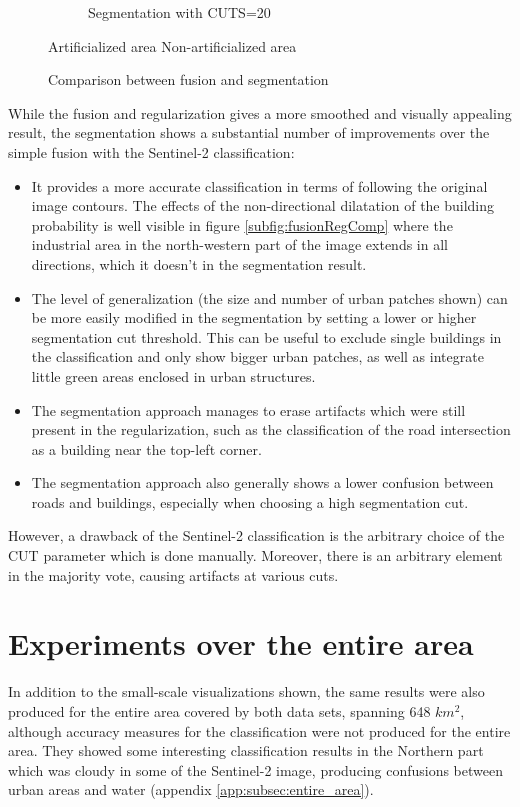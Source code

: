 \documentclass[10pt]{article}
\newcommand{\legendebin}{\vspace{3mm}
    
    \small\centering
    \fcolorbox{black}{red}{\rule{0pt}{6pt}\rule{6pt}{0pt}}\quad Artificialized area 
    \fcolorbox{black}{green}{\rule{0pt}{6pt}\rule{6pt}{0pt}}\quad Non-artificialized area
    }
\begin{document}
\begin{figure}[H]
\begin{subfigure}{0.49\textwidth}
        \caption{Segmentation with CUTS=20}
    \end{subfigure}
    \legendebin
    \caption{Comparison between fusion and segmentation}
    \label{fig:comparison}
\end{figure}
While the fusion and regularization gives a more smoothed and visually appealing result, the segmentation shows a substantial number of improvements over the simple fusion with the Sentinel-2 classification:
\begin{itemize}
    \item It provides a more accurate classification in terms of following the original image contours. The effects of the non-directional dilatation of the building probability is well visible in figure \ref{subfig:fusionRegComp} where the industrial area in the north-western part of the image extends in all directions, which it doesn't in the segmentation result.
    \item The level of generalization (the size and number of urban patches shown) can be more easily modified in the segmentation by setting a lower or higher segmentation cut threshold. This can be useful to exclude single buildings in the classification and only show bigger urban patches, as well as integrate little green areas enclosed in urban structures. 
    \item The segmentation approach manages to erase artifacts which were still present in the regularization, such as the classification of the road intersection as a building near the top-left corner.
    \item The segmentation approach also generally shows a lower confusion between roads and buildings, especially when choosing a high segmentation cut.
\end{itemize}
However, a drawback of the Sentinel-2 classification is the arbitrary choice of the CUT parameter which is done manually. Moreover, there is an arbitrary element in the majority vote, causing artifacts at various cuts.


\section{Experiments over the entire area}
In addition to the small-scale visualizations shown, the same results were also produced for the entire area covered by both data sets, spanning 648 $km^2$, although accuracy measures for the classification were not produced for the entire area. They showed some interesting classification results in the Northern part which was cloudy in some of the Sentinel-2 image, producing confusions between urban areas and water (appendix \ref{app:subsec:entire_area}).
\end{document}
